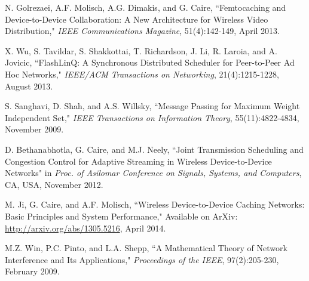 \documentclass[journal]{IEEEtran}
\begin{document}
 \vspace{-1.0mm}
\begin{thebibliography}{1}
 N. Golrezaei, A.F. Molisch, A.G. Dimakis, and G. Caire, ``Femtocaching and Device-to-Device Collaboration: A New Architecture for Wireless Video Distribution," \textit{IEEE Communications Magazine}, 51(4):142-149, April 2013.

 X. Wu, S. Tavildar, S. Shakkottai, T. Richardson, J. Li, R. Laroia, and A. Jovicic, ``FlashLinQ: A Synchronous Distributed Scheduler for Peer-to-Peer Ad Hoc Networks," \textit{IEEE/ACM Transactions on Networking}, 21(4):1215-1228, August 2013.

 S. Sanghavi, D. Shah, and A.S. Willsky, ``Message Passing for Maximum Weight Independent Set," \textit{IEEE Transactions on Information Theory}, 55(11):4822-4834, November 2009.

 D. Bethanabhotla, G. Caire, and M.J. Neely, ``Joint Transmission Scheduling and Congestion Control for Adaptive Streaming in Wireless Device-to-Device Networks" in \textit{Proc. of Asilomar Conference on Signals, Systems, and Computers}, CA, USA, November 2012.

 M. Ji, G. Caire, and A.F. Molisch, ``Wireless Device-to-Device Caching Networks: Basic Principles and System Performance," Available on ArXiv: \url{http://arxiv.org/abs/1305.5216}, April 2014.

 M.Z. Win, P.C. Pinto, and L.A. Shepp, ``A Mathematical Theory of Network Interference and Its Applications," \textit{Proceedings of the IEEE}, 97(2):205-230, February 2009.


\end{thebibliography}
\end{document}
